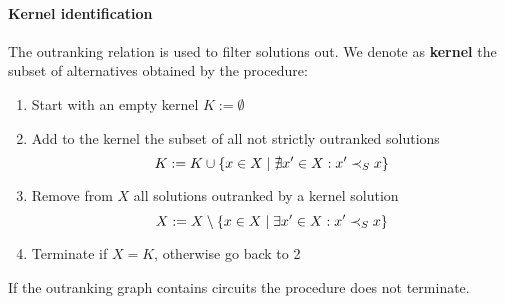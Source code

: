 \paragraph{Kernel identification} The outranking relation is used to filter solutions out. We denote as \textbf{kernel} the subset of alternatives obtained by the procedure: 
\begin{enumerate}
	\item Start with an empty kernel $K := \emptyset$ 
	
	\item Add to the kernel the subset of all not strictly outranked solutions
	$$ K := K \cup \left\{x \in X \mid \nexists x' \in X : x' \prec_{S} x \right\} $$
	
	\item Remove from $X$ all solutions outranked by a kernel solution
	$$ X := X \setminus \left\{x \in X \mid \exists x' \in X : x' \prec_{S} x \right\} $$
	
	\item Terminate if $X = K$, otherwise go back to 2
\end{enumerate}

If the outranking graph contains circuits the procedure does not terminate. 

